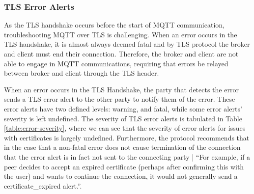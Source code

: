 \documentclass[12pt]{article}
\begin{document}
\subsubsection{TLS Error Alerts}
As the TLS handshake occurs before the start of MQTT communication, troubleshooting MQTT over TLS is challenging. When an error occurs in the TLS handshake, it is almost always deemed fatal and by TLS protocol the broker and client must end their connection\cite{tls1.2errors}. Therefore, the broker and client are not able to engage in MQTT communications, requiring that errors be relayed between broker and client through the TLS header.\par
When an error occurs in the TLS Handshake, the party that detects the error sends a TLS error alert to the other party to notify them of the error. These error alerts have two defined levels: warning, and fatal, while some error alerts' severity is left undefined. The severity of TLS error alerts is tabulated in Table \ref{table:error-severity}, where we can see that the severity of error alerts for issues with certificates is largely undefined. Furthermore, the protocol recommends that in the case that a non-fatal error does not cause termination of the connection that the error alert is in fact not sent to the connecting party | ``For example, if a peer decides to accept an expired certificate (perhaps after confirming this with the user) and wants to continue the connection, it would not generally send a certificate\_expired alert.''\cite{tls1.2errors}. 
\end{document}
